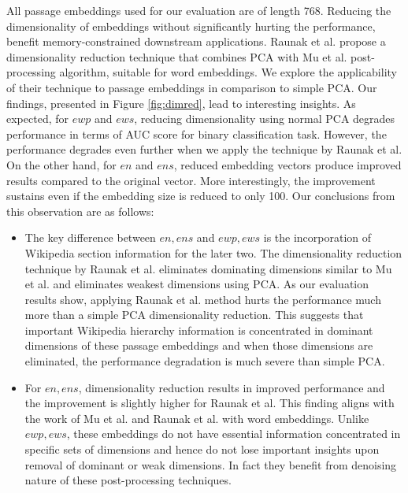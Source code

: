All passage embeddings used for our evaluation are of length 768. Reducing the dimensionality of embeddings without significantly hurting the performance, benefit memory-constrained downstream applications. Raunak et al. propose a dimensionality reduction technique that combines PCA with Mu et al. post-processing algorithm, suitable for word embeddings. We explore the applicability of their technique to passage embeddings in comparison to simple PCA. Our findings, presented in Figure \ref{fig:dimred}, lead to interesting insights. As expected, for $ewp$ and $ews$, reducing dimensionality using normal PCA degrades performance in terms of AUC score for binary classification task. However, the performance degrades even further when we apply the technique by Raunak et al. On the other hand, for $en$ and $ens$, reduced embedding vectors produce improved results compared to the original vector. More interestingly, the improvement sustains even if the embedding size is reduced to only 100. Our conclusions from this observation are as follows:
\begin{itemize}
    \item The key difference between $en, ens$ and $ewp, ews$ is the incorporation of Wikipedia section information for the later two. The dimensionality reduction technique by Raunak et al. eliminates dominating dimensions similar to Mu et al. and eliminates weakest dimensions using PCA. As our evaluation results show, applying Raunak et al. method hurts the performance much more than a simple PCA dimensionality reduction. This suggests that important Wikipedia hierarchy information is concentrated in dominant dimensions of these passage embeddings and when those dimensions are eliminated, the performance degradation is much severe than simple PCA.
    \item For $en, ens$, dimensionality reduction results in improved performance and the improvement is slightly higher for Raunak et al. This finding aligns with the work of Mu et al. and Raunak et al. with word embeddings. Unlike $ewp, ews$, these embeddings do not have essential information concentrated in specific sets of dimensions and hence do not lose important insights upon removal of dominant or weak dimensions. In fact they benefit from denoising nature of these post-processing techniques.
\end{itemize}

